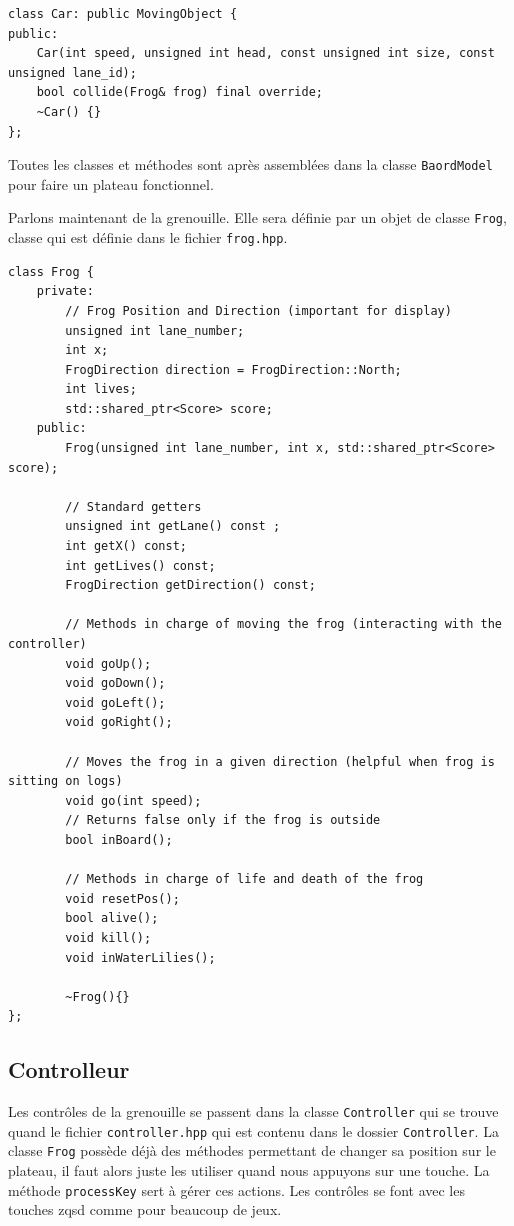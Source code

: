 \documentclass[a4paper, 12pt]{article}
\begin{document}
\begin{lstlisting}
class Car: public MovingObject {
public:
    Car(int speed, unsigned int head, const unsigned int size, const unsigned lane_id);
    bool collide(Frog& frog) final override;
    ~Car() {}
};
\end{lstlisting}

Toutes les classes et méthodes sont après assemblées dans la classe \texttt{BaordModel} 
pour faire un plateau fonctionnel.

Parlons maintenant de la grenouille. 
Elle sera définie par un objet de classe \texttt{Frog}, 
classe qui est définie dans le fichier \texttt{frog.hpp}.

\begin{lstlisting}
class Frog {
    private:
        // Frog Position and Direction (important for display)
        unsigned int lane_number;
        int x;
        FrogDirection direction = FrogDirection::North;
        int lives;
        std::shared_ptr<Score> score;
    public:
        Frog(unsigned int lane_number, int x, std::shared_ptr<Score> score);

        // Standard getters
        unsigned int getLane() const ;
        int getX() const;
        int getLives() const;
        FrogDirection getDirection() const;

        // Methods in charge of moving the frog (interacting with the controller)
        void goUp();
        void goDown();
        void goLeft();
        void goRight();

        // Moves the frog in a given direction (helpful when frog is sitting on logs)
        void go(int speed);
        // Returns false only if the frog is outside
        bool inBoard();

        // Methods in charge of life and death of the frog
        void resetPos();
        bool alive();
        void kill();
        void inWaterLilies();

        ~Frog(){}
};
\end{lstlisting}

\subsection{Controlleur}

Les contrôles de la grenouille se passent dans la classe \texttt{Controller} 
qui se trouve quand le fichier \texttt{controller.hpp} qui est contenu dans 
le dossier \texttt{Controller}.
La classe \texttt{Frog} possède déjà des méthodes permettant de changer sa position 
sur le plateau, il faut alors juste les utiliser quand nous appuyons sur une touche. 
La méthode \texttt{processKey} sert à gérer ces actions. 
Les contrôles se font avec les touches zqsd comme pour beaucoup de jeux. 
\end{document}
